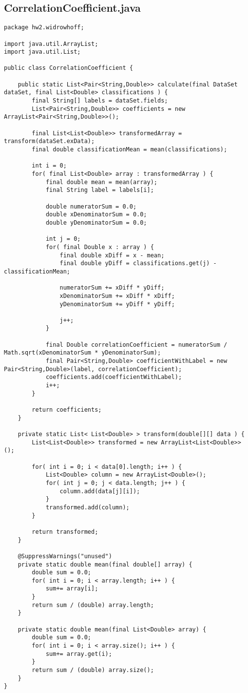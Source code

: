 \subsection{CorrelationCoefficient.java}
\begin{lstlisting}
package hw2.widrowhoff;

import java.util.ArrayList;
import java.util.List;

public class CorrelationCoefficient {

	public static List<Pair<String,Double>> calculate(final DataSet dataSet, final List<Double> classifications ) {
		final String[] labels = dataSet.fields;
		List<Pair<String,Double>> coefficients = new ArrayList<Pair<String,Double>>();
		
		final List<List<Double>> transformedArray = transform(dataSet.exData);
		final double classificationMean = mean(classifications);
		
		int i = 0;
		for( final List<Double> array : transformedArray ) {
			final double mean = mean(array);
			final String label = labels[i];
			
			double numeratorSum = 0.0;
			double xDenominatorSum = 0.0;
			double yDenominatorSum = 0.0;
			
			int j = 0;
			for( final Double x : array ) {
				final double xDiff = x - mean;
				final double yDiff = classifications.get(j) - classificationMean;
				
				numeratorSum += xDiff * yDiff;
				xDenominatorSum += xDiff * xDiff;
				yDenominatorSum += yDiff * yDiff;
				
				j++;
			}
			
			final Double correlationCoefficient = numeratorSum / Math.sqrt(xDenominatorSum * yDenominatorSum);
			final Pair<String,Double> coefficientWithLabel = new Pair<String,Double>(label, correlationCoefficient);
			coefficients.add(coefficientWithLabel);
			i++;
		}
		
		return coefficients;
	}
	
	private static List< List<Double> > transform(double[][] data ) {
		List<List<Double>> transformed = new ArrayList<List<Double>>();
		
		for( int i = 0; i < data[0].length; i++ ) {
			List<Double> column = new ArrayList<Double>();
			for( int j = 0; j < data.length; j++ ) {
				column.add(data[j][i]);
			}
			transformed.add(column);
		}
		
		return transformed;
	}
	
	@SuppressWarnings("unused")
	private static double mean(final double[] array) {
		double sum = 0.0;
		for( int i = 0; i < array.length; i++ ) {
			sum+= array[i];
		}
		return sum / (double) array.length;
	}
	
	private static double mean(final List<Double> array) {
		double sum = 0.0;
		for( int i = 0; i < array.size(); i++ ) {
			sum+= array.get(i);
		}
		return sum / (double) array.size();
	}
}
\end{lstlisting}
